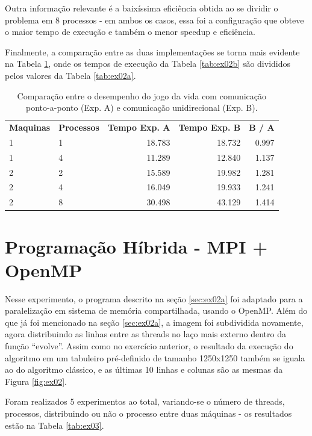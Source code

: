 \documentclass[conference]{IEEEtran}
\begin{document}
Outra informação relevante é a baixíssima eficiência obtida ao se dividir o problema em 8 processos - em ambos os casos, essa foi a configuração que obteve o maior tempo de execução e também o menor speedup e eficiência.

Finalmente, a comparação entre as duas implementações se torna mais evidente na Tabela \ref{tab:ex02comp}, onde os tempos de execução da Tabela \ref{tab:ex02b} são divididos pelos valores da Tabela \ref{tab:ex02a}.


\begin{table}[htb!]
  \centering
	\begin{adjustbox}{max width=\linewidth}
	\begin{tabular}{llrrr}%
		\bfseries Maquinas & \bfseries Processos & \bfseries Tempo Exp. A & \bfseries Tempo Exp. B & \bfseries B / A  \\
    1	& 1 &	18.783 & 18.732 &	0.997 \\
    1	& 4 &	11.289 & 12.840 &	1.137 \\
    2	& 2 &	15.589 & 19.982 &	1.281 \\
    2	& 4 &	16.049 & 19.933 &	1.241 \\
    2	& 8 &	30.498 & 43.129 &	1.414 \\
	\end{tabular}
	\end{adjustbox}
	\caption{\label{tab:ex02comp}Comparação entre o desempenho do jogo da vida com comunicação ponto-a-ponto (Exp. A) e comunicação unidirecional (Exp. B).}
\end{table}

\section{ Programação Híbrida - MPI + OpenMP\label{sec:ex03}}
Nesse experimento, o programa descrito na seção \ref{sec:ex02a} foi adaptado para a paralelização em sistema de memória compartilhada, usando o OpenMP.
Além do que já foi mencionado na seção \ref{sec:ex02a}, a imagem foi subdividida novamente, agora distribuindo as linhas entre as threads no laço mais externo dentro da função ``evolve''.
Assim como no exercício anterior, o resultado da execução do algoritmo em um tabuleiro pré-definido de tamanho 1250x1250 também se iguala ao do algoritmo clássico, e as últimas 10 linhas e colunas são as mesmas da Figura \ref{fig:ex02}.


Foram realizados 5 experimentos ao total, variando-se o número de threads, processos, distribuindo ou não o processo entre duas máquinas - os resultados estão na Tabela \ref{tab:ex03}.
\end{document}
